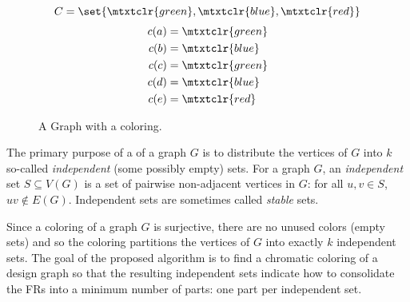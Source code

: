 \begin{figure}[H]
  \begin{minipage}{3in}
    \centering
  \end{minipage}
  \begin{minipage}{3in}
    \[C=\set{\mtxtclr{green},\mtxtclr{blue},\mtxtclr{red}}\]
    \begin{align*}
      c(a) &= \mtxtclr{green} \\
      c(b) &= \mtxtclr{blue} \\
      c(c) &= \mtxtclr{green} \\
      c(d) &= \mtxtclr{blue} \\
      c(e) &= \mtxtclr{red}
    \end{align*}
  \end{minipage}
  \caption{A Graph with a  coloring.}
  \label{fig:exchromatic}
\end{figure}

The primary purpose of a  of a graph \(G\) is to distribute the vertices of \(G\) into \(k\) so-called
\emph{independent} (some possibly empty) sets.  For a graph \(G\), an \emph{independent} set \(S\subseteq V(G)\) is
a set of pairwise non-adjacent vertices in \(G\): for all \(u,v\in S\), \(uv\notin E(G)\).  Independent sets are
sometimes called \emph{stable} sets.

Since a  coloring of a graph \(G\) is surjective, there are no unused colors (empty sets) and so the
coloring partitions the vertices of \(G\) into exactly \(k\) independent sets.  The goal of the proposed algorithm
is to find a chromatic coloring of a design graph so that the resulting independent sets indicate how to
consolidate the FRs into a minimum number of parts: one part per independent set.

